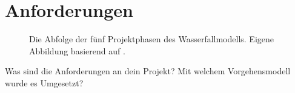 \section{Anforderungen} \label{sec:anforderungen}

\begin{figure}[H]
    \centering 
    
    \caption[Die Abfolge der fünf Projektphasen des Wasserfallmodells.]{Die Abfolge der fünf Projektphasen des Wasserfallmodells. Eigene Abbildung basierend auf \cite{projektmanagement}.}
    \label{fig:wasserfallmodell}
\end{figure}

Was sind die Anforderungen an dein Projekt? Mit welchem Vorgehensmodell wurde es Umgesetzt?
